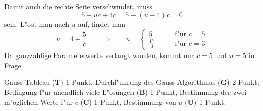 \begin{loesung}
Damit auch die rechte Seite verschwindet, muss
\[
5-uc+4c=5-(u-4)c=0
\]
sein.
L"ost man nach $u$ auf, findet man
\[
u=4+\frac{5}{c}
\qquad\Rightarrow\qquad
u=\begin{cases}
5&\qquad\text{f"ur $c=5$}\\
\frac{17}{3}&\qquad\text{f"ur $c=3$}
\end{cases}
\]
Da ganzzahlige Parameterwerte verlangt wurden, kommt nur $c=5$ und $u=5$
in Frage.
\end{loesung}

\begin{bewertung}
Gauss-Tableau ({\bf T}) 1 Punkt,
Durchf"uhrung des Gauss-Algorithmus ({\bf G}) 2 Punkt,
Bedingung f"ur unendlich viele L"osungen ({\bf B}) 1 Punkt,
Bestimmung der zwei m"oglichen Werte f"ur $c$ ({\bf C}) 1 Punkt,
Bestimmung von $u$ ({\bf U}) 1 Punkt.
\end{bewertung}


